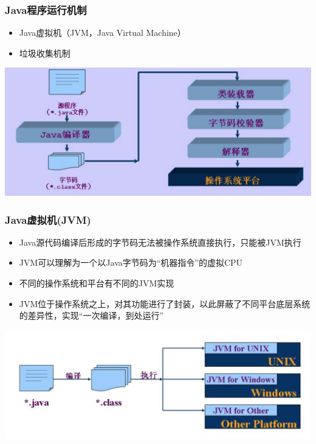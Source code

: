\begin{frame}
  \frametitle{Java程序运行机制}
  \begin{itemize}
    \item Java虚拟机（JVM，Java Virtual Machine）
    \item 垃圾收集机制
  \end{itemize}
  \includegraphics[width=\textwidth]{figures/java_workflow}
\end{frame}

\begin{frame}
  \frametitle{Java虚拟机(JVM)}
  \begin{itemize}
    \item Java源代码编译后形成的字节码无法被操作系统直接执行，只能被JVM执行
    \item JVM可以理解为一个以Java字节码为“机器指令”的虚拟CPU
    \item 不同的操作系统和平台有不同的JVM实现
    \item JVM位于操作系统之上，对其功能进行了封装，以此屏蔽了不同平台底层系统的差异性，实现“一次编译，到处运行”
  \end{itemize}
  \includegraphics[width=\textwidth]{figures/jvm}

\end{frame}

